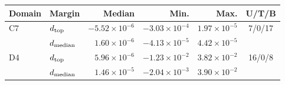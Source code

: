 \begin{tabular}{llrrrc}
\toprule
Domain & Margin & Median & Min. & Max. & U/T/B \\
\midrule
C7 & $d_{\rm top}$ & $-5.52\!\times\!10^{-6}$ & $-3.03\!\times\!10^{-4}$ & $1.97\!\times\!10^{-5}$ & 7/0/17 \\
 & $d_{\rm median}$ & $1.60\!\times\!10^{-6}$ & $-4.13\!\times\!10^{-5}$ & $4.42\!\times\!10^{-5}$ &  \\
D4 & $d_{\rm top}$ & $5.96\!\times\!10^{-6}$ & $-1.23\!\times\!10^{-2}$ & $3.82\!\times\!10^{-2}$ & 16/0/8 \\
 & $d_{\rm median}$ & $1.46\!\times\!10^{-5}$ & $-2.04\!\times\!10^{-3}$ & $3.90\!\times\!10^{-2}$ &  \\
\bottomrule
\end{tabular}
